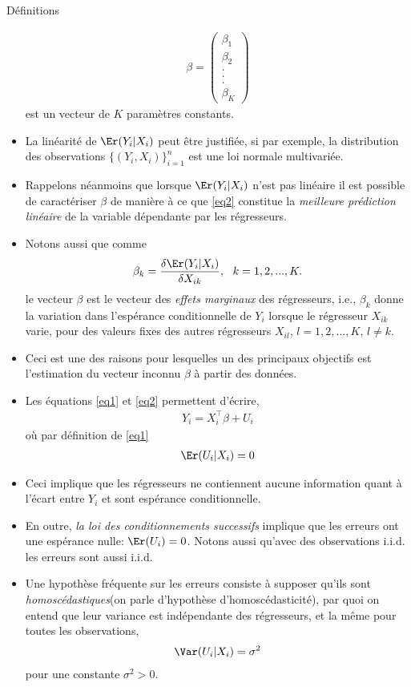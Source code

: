 \begin{frame}[allowframebreaks]{Définitions}
\begin{itemize}
\begin{align*}
 \beta = \left(
 \begin{array}{c}
 \beta_1\\
 \beta_2\\
 .\\
 .\\
 .\\
 \beta_K
 \end{array}
 \right)
\end{align*}
est un vecteur de $K$ paramètres constants. 
\item La linéarité de $\Er(Y_i|X_i)$ peut être justifiée, si par exemple, la distribution des observations $\{(Y_i, X_i)\}_{i=1}^n$ est une loi normale multivariée. 
\item Rappelons néanmoins que lorsque $\Er(Y_i|X_i)$ n'est pas linéaire il est possible de caractériser $\beta$ de manière à ce que \eqref{eq2} constitue la \emph{meilleure prédiction linéaire} de la variable dépendante par les régresseurs. 
\item Notons aussi que comme
\begin{align*}
\beta_k = \frac{\delta \Er(Y_i|X_i)}{\delta X_{ik}}, \ \ k=1,2,...,K.
\end{align*}
le vecteur $\beta$ est le vecteur des \emph{effets marginaux} des régresseurs, i.e., $\beta_k$ donne la variation dans l'espérance  conditionnelle de $Y_i$ lorsque le régresseur $X_{ik}$ varie, pour des valeurs fixes des autres régresseurs $X_{il}$, $l=1,2,...,K$, $l\neq k$. 
\item Ceci est une des raisons pour lesquelles un des principaux objectifs est l'estimation du vecteur inconnu $\beta$ à partir des données.
\item Les équations \eqref{eq1} et \eqref{eq2} permettent d'écrire,
\begin{align}
Y_i = X_i^\top\beta +U_i
\label{eq3}
\end{align}
où par définition de \eqref{eq1}
\begin{align}
\Er(U_i|X_i) = 0
\label{eq4}
\end{align}
\item Ceci implique que les régresseurs ne contiennent aucune information quant à l'écart entre $Y_i$ et sont espérance conditionnelle. 
\item En outre, \emph{la loi des conditionnements successifs} implique que les erreurs ont une espérance nulle: $\Er(U_i) = 0$. Notons aussi qu'avec des observations i.i.d. les erreurs sont aussi i.i.d.
\item Une hypothèse fréquente sur les erreurs consiste à supposer qu'ils sont \emph{homoscédastiques}(on parle d'hypothèse d'homoscédasticité), par quoi on entend que leur variance est indépendante des régresseurs, et la même pour toutes les observations,
\begin{align*}
\Var(U_i|X_i) = \sigma^2
\end{align*}
pour une constante $\sigma^2>0$.
\end{itemize}
\end{frame}


